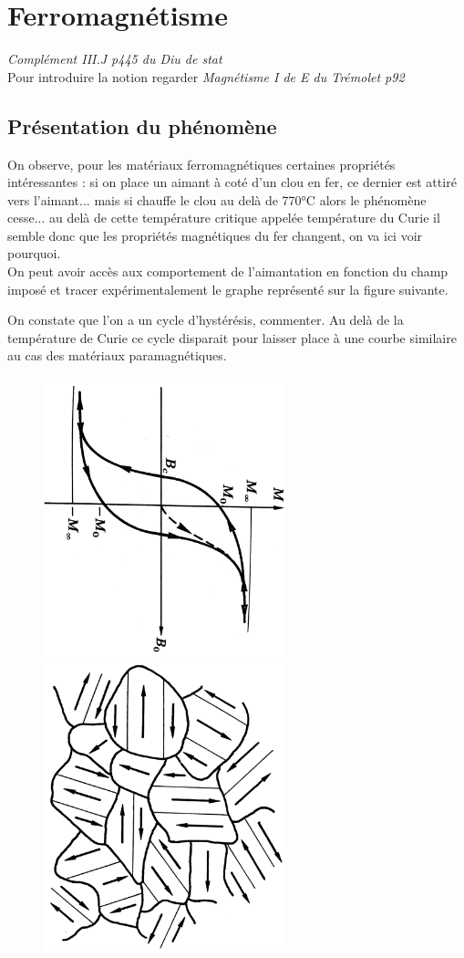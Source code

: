 \documentclass[12pt,prb,aps,epsf]{article}
\begin{document}
\section{Ferromagnétisme}
\textit{Complément III.J p445 du Diu de stat}\\
Pour introduire la notion regarder \textit{Magnétisme I de E du Trémolet p92}
\subsection{Présentation du phénomène}
On observe, pour les matériaux ferromagnétiques certaines propriétés intéressantes : si on place un aimant à coté d'un clou en fer, ce dernier est attiré vers l'aimant... mais si chauffe le clou au delà de 770°C alors le phénomène cesse... au delà de cette température critique appelée température du Curie il semble donc que les propriétés magnétiques du fer changent, on va ici voir pourquoi.\\  

On peut avoir accès aux comportement de l'aimantation en fonction du champ imposé et tracer expérimentalement le graphe représenté sur la figure suivante.

On constate que l'on a un cycle d'hystérésis, commenter.
Au delà de la température de Curie ce cycle disparait pour laisser place à une courbe similaire au cas des matériaux paramagnétiques.\\ 
\begin{figure}[h]
	\centerline{\includegraphics[width=7cm, angle=90]{hysteresis}
				\includegraphics[width=7cm,angle=90]{weiss}}
\end{figure}
\end{document}
